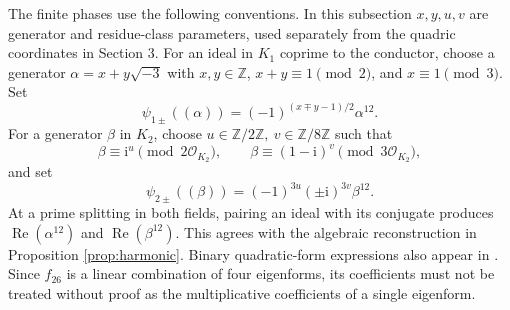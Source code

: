 \documentclass[a4paper,11pt]{article}
\theoremstyle{definition}
\DeclareMathOperator{\Repart}{Re}
\newcommand{\Z}{\mathbb Z}
\newcommand{\iu}{\mathrm i}
\begin{document}
The finite phases use the following conventions.
In this subsection \(x,y,u,v\) are generator and residue-class parameters,
used separately from the quadric coordinates in Section 3.
For an ideal in \(K_1\) coprime to the conductor, choose a generator
\(\alpha=x+y\sqrt{-3}\) with \(x,y\in\Z\),
\(x+y\equiv1\pmod2\), and \(x\equiv1\pmod3\). Set
\begin{equation}\label{eq:psi1}
 \psi_{1\pm}((\alpha))=(-1)^{(x\mp y-1)/2}\alpha^{12}.
\end{equation}
For a generator \(\beta\) in \(K_2\), choose
\(u\in\Z/2\Z,\ v\in\Z/8\Z\) such that
\[
 \beta\equiv\iu^u\pmod{2\mathcal O_{K_2}},\qquad
 \beta\equiv(1-\iu)^v\pmod{3\mathcal O_{K_2}},
\]
and set
\begin{equation}\label{eq:psi2}
 \psi_{2\pm}((\beta))=(-1)^{3u}(\pm\iu)^{3v}\beta^{12}.
\end{equation}
At a prime splitting in both fields, pairing an ideal with its conjugate
produces \(\Repart(\alpha^{12})\) and \(\Repart(\beta^{12})\).
This agrees with the algebraic reconstruction in
Proposition \ref{prop:harmonic}. Binary quadratic-form expressions
also appear in \cite{ChanCooperToh2006}.
Since \(f_{26}\) is a linear combination of four eigenforms, its
coefficients must not be treated without proof as the multiplicative
coefficients of a single eigenform.

\end{document}
